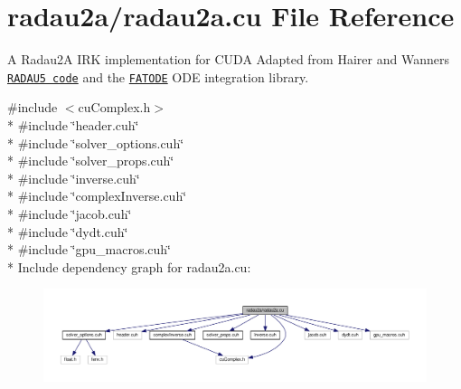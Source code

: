 \hypertarget{radau2a_8cu}{}\section{radau2a/radau2a.cu File Reference}
\label{radau2a_8cu}


A Radau2A I\+RK implementation for C\+U\+DA Adapted from Hairer and Wanner\textquotesingle{}s \href{http://www.unige.ch/~hairer/prog/stiff/radau5.f}{\tt R\+A\+D\+A\+U5 code} and the \href{http://people.cs.vt.edu/~asandu/Software/FATODE/index.html}{\tt F\+A\+T\+O\+DE} O\+DE integration library.  


{\ttfamily \#include $<$cu\+Complex.\+h$>$}\\*
{\ttfamily \#include \char`\"{}header.\+cuh\char`\"{}}\\*
{\ttfamily \#include \char`\"{}solver\+\_\+options.\+cuh\char`\"{}}\\*
{\ttfamily \#include \char`\"{}solver\+\_\+props.\+cuh\char`\"{}}\\*
{\ttfamily \#include \char`\"{}inverse.\+cuh\char`\"{}}\\*
{\ttfamily \#include \char`\"{}complex\+Inverse.\+cuh\char`\"{}}\\*
{\ttfamily \#include \char`\"{}jacob.\+cuh\char`\"{}}\\*
{\ttfamily \#include \char`\"{}dydt.\+cuh\char`\"{}}\\*
{\ttfamily \#include \char`\"{}gpu\+\_\+macros.\+cuh\char`\"{}}\\*
Include dependency graph for radau2a.\+cu\+:\nopagebreak
\begin{figure}[H]
\begin{center}
\leavevmode
\includegraphics[width=350pt]{radau2a_8cu__incl}
\end{center}
\end{figure}
